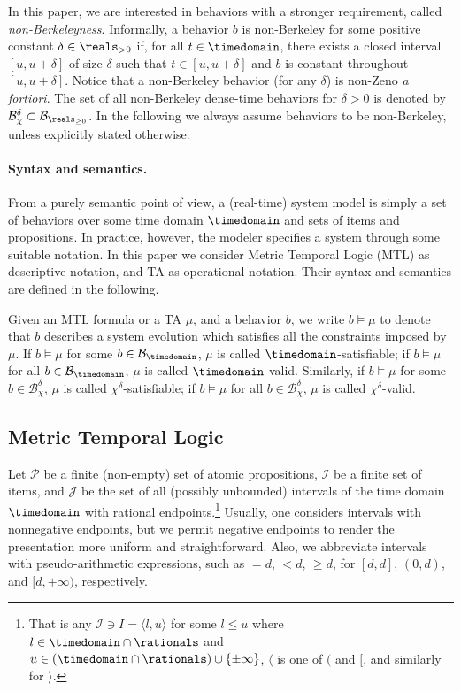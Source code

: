 \documentclass[a4paper]{article}
\newcommand{\Ical}{\mathcal{I}}
\newcommand{\Jcal}{\mathcal{J}}
\newcommand{\Pcal}{\mathcal{P}}
\newcommand{\Bchi}{\mathcal{B}_{\chi}}
\newcommand{\behav}{\mathcal{B}}
\theoremstyle{plain}
\theoremstyle{definition}
\begin{document}
In this paper, we are interested in behaviors with a stronger requirement, called \emph{non-Berkeleyness}.
Informally, a behavior $b$ is non-Berkeley for some positive constant $\delta \in \reals_{> 0}$ if, for all $t \in \timedomain$, there exists a closed interval $[u, u+\delta]$ of size $\delta$ such that $t \in [u, u+\delta]$ and $b$ is constant throughout $[u, u+\delta]$.
Notice that a non-Berkeley behavior (for any $\delta$) is non-Zeno \emph{a fortiori}. The set of all non-Berkeley dense-time behaviors for $\delta > 0$ is denoted by $\Bchi^\delta \subset \behav_{\reals_{\geq0}}$.
In the following we always assume behaviors to be non-Berkeley, unless explicitly stated otherwise.




\paragraph{Syntax and semantics.}
From a purely semantic point of view, a (real-time) system model is simply a set of behaviors \cite{AH92b,FMMR07-TR2007-22} over some time domain $\timedomain$ and sets of items and propositions.
In practice, however, the modeler specifies a system through some suitable notation.
In this paper we consider Metric Temporal Logic (MTL) \cite{Koy90,AH93} as descriptive notation, and TA \cite{AD94,AFH96} as operational notation.
Their syntax and semantics are defined in the following.

Given an MTL formula or a TA $\mu$, and a behavior $b$, we write $b \models \mu$ to denote that $b$ describes a system evolution which satisfies all the constraints imposed by $\mu$.
If $b \models \mu$ for some $b \in \behav_{\timedomain}$, $\mu$ is called $\timedomain$-satisfiable; if $b \models \mu$ for all $b \in \behav_{\timedomain}$, $\mu$ is called $\timedomain$-valid.
Similarly, if $b \models \mu$ for some $b \in \Bchi^\delta$, $\mu$ is called $\chi^\delta$-satisfiable; if $b \models \mu$ for all $b \in \Bchi^\delta$, $\mu$ is called $\chi^\delta$-valid.







\subsection{Metric Temporal Logic}
Let $\Pcal$ be a finite (non-empty) set of atomic propositions, $\Ical$ be a finite set of items, and $\Jcal$ be the set of all (possibly unbounded) intervals of the time domain $\timedomain$ with rational endpoints.\footnote{That is any $\Ical \ni I  = \langle l, u \rangle$ for some $l \leq u$ where $l \in \timedomain \cap \rationals$ and $u \in (\timedomain \cap \rationals) \cup \{\pm\infty\}$, $\langle$ is one of $($ and $[$, and similarly for $\rangle$.}
Usually, one considers intervals with nonnegative endpoints, but we permit negative endpoints to render the presentation more uniform and straightforward.
Also, we abbreviate intervals with pseudo-arithmetic expressions, such as $=d$, $<d$, $\geq d$, for $[d,d]$, $(0,d)$, and $[d, +\infty)$, respectively.
\end{document}
